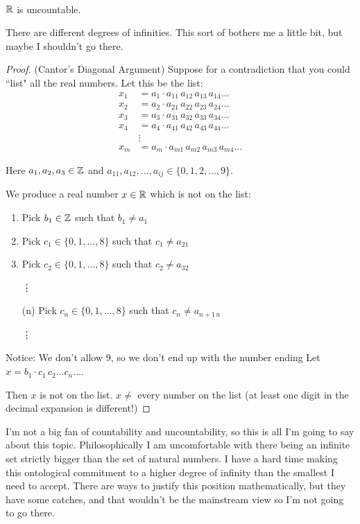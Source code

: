 \documentclass[twoside]{scrartcl}
\begin{document}
\

\begin{theorem}
$\mathbb{R}$ is uncountable.
\end{theorem}

There are different degrees of infinities. This sort of bothers me a little bit, but maybe I shouldn't go there. 

\begin{proof} (Cantor's Diagonal Argument)
Suppose for a contradiction that you could ``list" all the real numbers. Let this be the list: 
\[
\begin{aligned}
  x_1 &= a_1 \cdot a_{11}\,a_{12}\,a_{13}\,a_{14}\dots\\
  x_2 &= a_2 \cdot a_{21}\,a_{22}\,a_{23}\,a_{24}\dots\\
  x_3 &= a_3 \cdot a_{31}\,a_{32}\,a_{33}\,a_{34}\dots\\
  x_4 &= a_4 \cdot a_{41}\,a_{42}\,a_{43}\,a_{44}\dots\\
  &\vdots \\
  x_m &= a_m \cdot a_{m1}\,a_{m2}\,a_{m3}\,a_{m4}\dots 
\end{aligned}
\]

Here $a_1,a_2,a_3 \in\mathbb{Z}$ and $a_{11},a_{12},\dots,a_{ij} \in \{0,1,2,\dots,9\}$. 

We produce a real number $x \in\mathbb{R}$ which is not on the list:

\begin{enumerate}
\item Pick $b_1 \in\mathbb{Z}$ such that $b_1 \neq a_1$
\item Pick $c_1 \in \{0,1,\dots,8\}$ such that $c_1 \neq a_{21}$
\item Pick $c_2 \in \{0,1,\dots,8\}$ such that $c_2 \neq a_{32}$	

\hspace*{20pt} \vdots
\item[(n)] Pick $c_n \in \{0,1,\dots,8\}$ such that $c_n \neq a_{n+1\,n}$

\hspace*{20pt}\vdots 
\end{enumerate}

Notice: We don't allow $9$, so we don't end up with the number ending 
Let $x = b_1\cdot c_1\,c_2\dots c_n \dots$. 

Then $x$ is not on the list. $x \neq$ every number on the list (at least one digit in the decimal expansion is different!)
\end{proof}

I'm not a big fan of countability and uncountability, so this is all I'm going to say about this topic. Philosophically I am uncomfortable with there being an infinite set strictly bigger than the set of natural numbers. I have a hard time making this ontological commitment to a higher degree of infinity than the smallest I need to accept. There are ways to justify this position mathematically, but they have some catches, and that wouldn't be the mainstream view so I'm not going to go there. 
\end{document}
